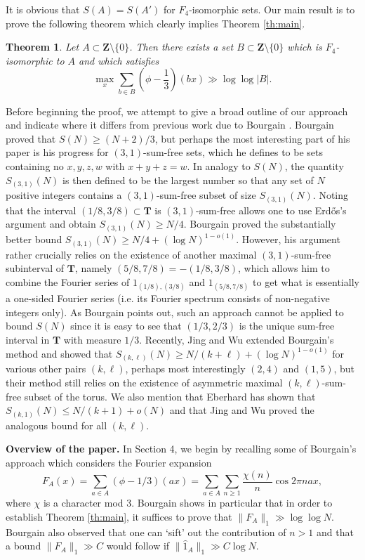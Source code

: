 \documentclass[11pt, reqno]{amsart}
\newtheorem{theorem}{Theorem}[section]
\begin{document}
It is obvious that $S(A)=S(A')$ for $F_4$-isomorphic sets. Our main result is to prove the following theorem which clearly implies Theorem \ref{th:main}.
\begin{theorem}
    Let $A\subset\mathbf{Z}\setminus\{0\}$. Then there exists a set $B\subset\mathbf{Z}\setminus\{0\}$ which is $F_4$-isomorphic to $A$ and which satisfies
    $$\max_{x}\sum_{b\in B}\left(\phi-\frac{1}{3}\right)(bx)\gg\log\log |B|.$$
    
\end{theorem}
Before beginning the proof, we attempt to give a broad outline of our approach and indicate where it differs from previous work due to Bourgain \cite{bourgain}. Bourgain proved that $S(N)\geqslant (N+2)/3$, but perhaps the most interesting part of his paper is his progress for $(3,1)$-sum-free sets, which he defines to be sets containing no $x,y,z,w$ with $x+y+z=w$. In analogy to $S(N)$, the quantity $S_{(3,1)}(N)$ is then defined to be the largest number so that any set of $N$ positive integers contains a $(3,1)$-sum-free subset of size $S_{(3,1)}(N)$. Noting that the interval $(1/8,3/8)\subset \mathbf{T}$ is $(3,1)$-sum-free allows one to use Erd\H{o}s's argument and obtain $S_{(3,1)}(N)\geqslant N/4$. Bourgain proved the substantially better bound $S_{(3,1)}(N)\geqslant N/4+(\log N)^{1-o(1)}$. However, his argument rather crucially relies on the existence of another maximal $(3,1)$-sum-free subinterval of $\mathbf{T}$, namely $(5/8,7/8)=-(1/8,3/8)$, which allows him to combine the Fourier series of $1_{(1/8),(3/8)}$ and $1_{(5/8,7/8)}$ to get what is essentially a one-sided Fourier series (i.e. its Fourier spectrum consists of non-negative integers only). As Bourgain points out, such an approach cannot be applied to bound $S(N)$ since it is easy to see that $(1/3,2/3)$ is the unique sum-free interval in $\mathbf{T}$ with measure $1/3$. Recently, Jing and Wu \cite{jingwu1, jingwu2} extended Bourgain's method and showed that $S_{(k,\ell)}(N)\geqslant N/(k+\ell)+(\log N)^{1-o(1)}$ for various other pairs $(k,\ell)$, perhaps most interestingly $(2,4)$ and $(1,5)$, but their method still relies on the existence of asymmetric maximal $(k,\ell)$-sum-free subset of the torus. We also mention that Eberhard \cite{eberhard} has shown that $S_{(k,1)}(N)\leqslant N/(k+1)+o(N)$ and that Jing and Wu proved the analogous bound for all $(k,\ell)$.

\medskip

\textbf{Overview of the paper.}
In Section 4, we begin by recalling some of Bourgain's approach which considers the Fourier expansion $$F_A(x)=\sum_{a\in A}(\phi-1/3)(ax)=\sum_{a\in A}\sum_{n\geqslant 1}\frac {\chi(n)}{n}\cos 2\pi nax,$$ where $\chi$ is a character mod 3. Bourgain shows in particular that in order to establish Theorem \ref{th:main}, it suffices to prove that $\lVert F_A\rVert_1\gg \log \log N$. Bourgain also observed that one can `sift' out the contribution of $n>1$ and that a bound $\lVert F_A\rVert_1\gg C$ would follow if $\lVert \hat{1}_A\rVert_1\gg C\log N$.
\end{document}
